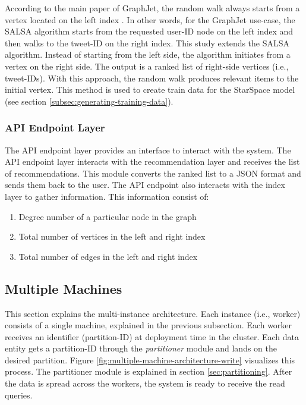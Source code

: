 According to the main paper of GraphJet, the random walk always starts from a vertex located on the left index \cite{sharmaGraphJetRealtimeContent2016}. In other words, for the GraphJet use-case, the SALSA algorithm starts from the requested user-ID node on the left index and then walks to the tweet-ID on the right index. This study extends the SALSA algorithm. Instead of starting from the left side, the algorithm initiates from a vertex on the right side. The output is a ranked list of right-side vertices (i.e., tweet-IDs). With this approach, the random walk produces relevant items to the initial vertex. This method is used to create train data for the StarSpace model (see section \ref{subsec:generating-training-data}).

\subsubsection{API Endpoint Layer}
\label{subsubsec:api-endpoint-layer}
The API endpoint layer provides an interface to interact with the system. The API endpoint layer interacts with the recommendation layer and receives the list of recommendations. This module converts the ranked list to a JSON format and sends them back to the user.
The API endpoint also interacts with the index layer to gather information. This information consist of:

\begin{enumerate}
    \item Degree number of a particular node in the graph
    \item Total number of vertices in the left and right index
    \item Total number of edges in the left and right index
\end{enumerate}

\subsection{Multiple Machines}
\label{subsec:multiple-machines}
This section explains the multi-instance architecture. Each instance (i.e., worker) consists of a single machine, explained in the previous subsection. Each worker receives an identifier (partition-ID) at deployment time in the cluster. Each data entity gets a partition-ID through the \emph{partitioner} module and lands on the desired partition. Figure \ref{fig:multiple-machine-architecture-write} visualizes this process. The partitioner module is explained in section \ref{sec:partitioning}. After the data is spread across the workers, the system is ready to receive the read queries. 


